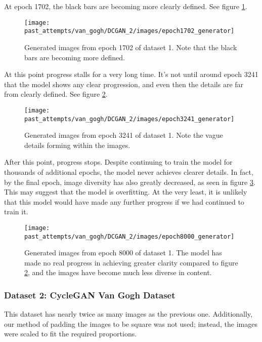 \documentclass[11pt,letterpaper]{article}
\begin{document}
				At epoch 1702, the black bars are becoming more clearly defined.
				See figure \ref{fig:vgm:epoch1702generator}.
				\begin{figure}
					\centering
					\texttt{[image: past\_attempts/van\_gogh/DCGAN\_2/images/epoch1702\_generator]}
					\caption[Van Gogh Museum dataset, epoch 1702]{Generated images from epoch 1702 of dataset 1. Note that the black bars are becoming more defined.}
					\label{fig:vgm:epoch1702generator}
				\end{figure}

				At this point progress stalls for a very long time.
				It's not until around epoch 3241 that the model shows any clear progression, and even then the details are far from clearly defined.
				See figure \ref{fig:vgm:epoch3241generator}.
				\begin{figure}
					\centering
					\texttt{[image: past\_attempts/van\_gogh/DCGAN\_2/images/epoch3241\_generator]}
					\caption[Van Gogh Museum dataset, epoch 3241]{Generated images from epoch 3241 of dataset 1. Note the vague details forming within the images.}
					\label{fig:vgm:epoch3241generator}
				\end{figure}

				After this point, progress stops.
				Despite continuing to train the model for thousands of additional epochs, the model never achieves clearer details.
				In fact, by the final epoch, image diversity has also greatly decreased, as seen in figure \ref{fig:vgm:epoch8000generator}.
				This may suggest that the model is overfitting.
				At the very least, it is unlikely that this model would have made any further progress if we had continued to train it.
				\begin{figure}
					\centering
					\texttt{[image: past\_attempts/van\_gogh/DCGAN\_2/images/epoch8000\_generator]}
					\caption[Van Gogh Museum dataset, epoch 8000]{Generated images from epoch 8000 of dataset 1. The model has made no real progress in achieving greater clarity compared to figure \ref{fig:vgm:epoch3241generator}, and the images have become much less diverse in content.}
					\label{fig:vgm:epoch8000generator}
				\end{figure}
			\subsubsection{Dataset 2: CycleGAN Van Gogh Dataset}
				This dataset has nearly twice as many images as the previous one.
				Additionally, our method of padding the images to be square was not used; instead, the images were scaled to fit the required proportions.
\end{document}
